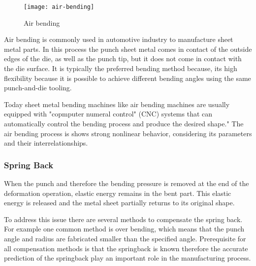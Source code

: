 \begin{figure}[H]
    \centering
    \texttt{[image: air-bending]}
    \caption{Air bending \cite[p. 416]{groover_fundamentalsmodernmanufacturing_2020}}
    \label{fig:air-bending}
\end{figure}

Air bending is commonly used in automotive industry to manufacture sheet metal parts. \cite[p. 342]{kim_predictionbendallowance_2007}
In this process the punch sheet metal comes in contact of the outside edges of the die, as well as the punch tip, but it does not come in contact with the die surface. 
It is typically the preferred bending method because, its high flexibility because it is possible to achieve different bending angles using the same punch-and-die tooling.
\cite[p. 3]{miranda_formingspringbackprediction_2018}\cite[p. 1]{cruz_applicationmachinelearning_2021} 

Today sheet metal bending machines like air bending machines are usually equipped with "copmputer numeral control" (CNC) systems that can automatically control the bending process and produce the desired shape." \cite[p. 3]{miranda_formingspringbackprediction_2018}
The air bending process is shows strong nonlinear behavior, considering its parameters and their interrelationships. \cite[p. 3]{miranda_formingspringbackprediction_2018}

\subsubsection{Spring Back} 
When the punch and therefore the bending pressure is removed at the end of the deformation operation, elastic energy remains in the bent part. This elastic energy is released and the metal sheet partially returns to its original shape. \cite[p. 113-114]{groover_fundamentalsmodernmanufacturing_2020} 

To address this issue there are several methods to compensate the spring back. For example one common method is over bending, which means that the punch angle and radius are fabricated smaller than the specified angle. 
\cite[p. 114]{groover_fundamentalsmodernmanufacturing_2020}
Prerequisite for all compensation methods is that the springback is known therefore the accurate prediction of the springback play an important role in the manufacturing process.

